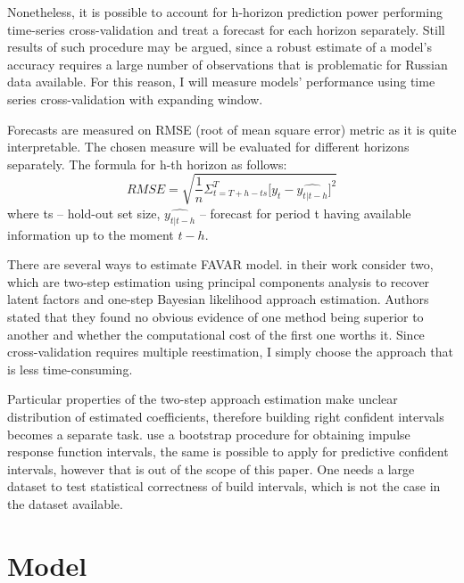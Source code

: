 \documentclass[a4paper, 14pt]{article}
\begin{document}
Nonetheless, it is possible to account for h-horizon prediction power performing time-series cross-validation and treat a forecast for each horizon separately. Still results of such procedure may be argued, since a robust estimate of a model's accuracy requires a large number of observations that is problematic for Russian data available. For this reason, I will measure models' performance using time series cross-validation with expanding window.

Forecasts are measured on RMSE (root of mean square error) metric
as it is quite interpretable. The chosen measure will be evaluated for different horizons separately. The formula for h-th horizon as follows:
\[
	RMSE = 
	\sqrt{
		\frac{1}{n}
		\Sigma_{t= T + h - ts}^{T}
			\Big[
			y_t - \widehat{y_{t|t-h}}
			\Big]^2}
\] where ts -- hold-out set size, $\widehat{y_{t|t-h}}$ -- forecast for period t having available information up to the moment $t-h$.


There are several ways to estimate FAVAR model. \cite{bernanke2005measuring} in their work consider two, which are two-step estimation using principal components analysis to recover latent factors and one-step Bayesian likelihood approach estimation. Authors stated that they found no obvious evidence of one method being superior to another and whether the computational cost of the first one worths it. Since cross-validation requires multiple reestimation, I simply choose the approach that is less time-consuming. 

Particular properties of the two-step approach estimation make unclear distribution of estimated coefficients, therefore building right confident intervals becomes a separate task. \cite{bernanke2005measuring} use a bootstrap procedure for obtaining impulse response function intervals, the same is possible to apply for predictive confident intervals, however that is out of the scope of this paper. One needs a large dataset to test statistical correctness of build intervals, which is not the case in the dataset available.

\section{Model}
\end{document}
